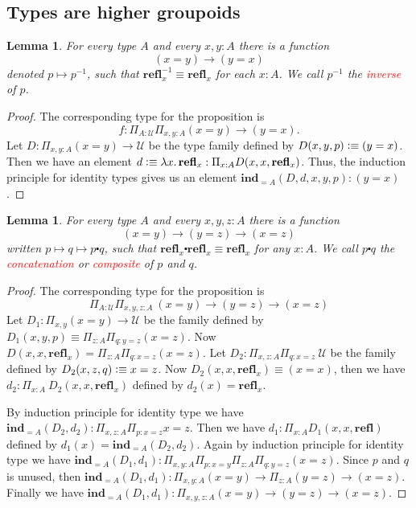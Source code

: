 \documentclass{article}
\newtheorem{lemma}[theorem]{Lemma}
\newcommand{\redt}[1]{\textcolor{red}{#1}}
\newcommand{\lam}[2]{\ensuremath{\lambda #1\ldotp #2}} %
\newcommand{\defeqv}{\vcentcolon\equiv}
\newcommand{\refl}{\textbf{refl}}
\newcommand{\ind}{\textbf{ind}}
\begin{document}
\subsection{Types are higher groupoids}

\begin{lemma}
\rm For every type $A$ and every $x,y : A$ there is a function
\[
    (x = y) \to (y = x)
\]
denoted $p \mapsto p^{-1}$, such that $\refl_x^{-1} \equiv \refl_x$ for each $x : A$. We call $p^{-1}$ the \redt{inverse} of $p$.
\end{lemma}

\begin{proof}
\rm The corresponding type for the proposition is
\[
    f : \Pi_{A : \mathcal{U}} \Pi_{x , y : A} (x = y) \to (y = x).
\]
Let $D : \Pi_{x, y : A} (x = y) \to \mathcal{U}$ be the type family defined by $D(x,y,p) \defeqv (y=x)$. Then we have an element $d \defeqv \lam{x}{\refl_x} : \Pi_{x : A} D(x,x,\refl_x)$. Thus, the induction principle for identity types gives us an element $\ind_{=A}(D,d,x,y,p) : (y = x)$.
\end{proof}

\begin{lemma}
\rm For every type $A$ and every $x,y,z : A$ there is a function 
\[
    (x = y) \to (y=z) \to (x=z)
\]
written $p \mapsto q \mapsto p \centerdot q$, such that $\refl_x \centerdot \refl_x \equiv \refl_x$ for any $x : A$. We call $p \centerdot q$ the \redt{concatenation} or \redt{composite} of $p$ and $q$.
\end{lemma}

\begin{proof}
\rm The corresponding type for the proposition is
\[
    \Pi_{A : \mathcal{U}}\Pi_{x,y,z : A} ~ (x = y) \to (y=z) \to (x=z)
\]
Let $D_1 : \Pi_{x,y} (x=y) \to \mathcal{U}$ be the family defined by $D_1(x,y,p) \equiv \Pi_{z : A} \Pi_{q : y = z} (x=z)$. Now $D(x,x,\refl_x) = \Pi_{z : A}\Pi_{q : x = z} (x=z)$. Let $D_2 : \Pi_{x,z : A} \Pi_{q : x=z}~\mathcal{U}$ be the family defined by $D_2(x,z,q) \defeqv x = z$. Now $D_2(x,x,\refl_x) \equiv (x=x)$, then we have $d_2 : \Pi_{x:A} ~ D_2(x,x,\refl_x)$ defined by $d_2(x) = \refl_x$. 

By induction principle for identity type we have $\ind_{=A} (D_2,d_2) : \Pi_{x,z : A} \Pi_{p : x=z} x = z$. Then we have $d_1 : \Pi_{x : A} D_1(x,x,\refl)$ defined by $d_1(x) = \ind_{=A} (D_2,d_2)$. Again by induction principle for identity type we have $\ind_{=A} (D_1,d_1) : \Pi_{x,y : A} \Pi_{p : x=y} \Pi_{z : A} \Pi_{q : y = z} (x=z)$. Since $p$ and $q$ is unused, then $\ind_{=A} (D_1,d_1) : \Pi_{x,y : A} (x=y)  \to \Pi_{z : A} (y = z) \to (x=z)$. Finally we have $\ind_{=A} (D_1,d_1) : \Pi_{x,y,z : A} (x=y)  \to (y = z) \to (x=z)$.
\end{proof}
\end{document}
